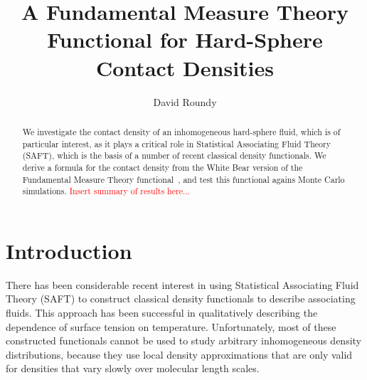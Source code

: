 \documentclass[letterpaper,twocolumn,amsmath,amssymb,prb]{revtex4-1}
\begin{document}
\title{A Fundamental Measure Theory Functional for Hard-Sphere Contact Densities}

\author{David Roundy}

\begin{abstract}
  We investigate the contact density of an inhomogeneous hard-sphere
  fluid, which is of particular interest, as it plays a critical role
  in Statistical Associating Fluid Theory (SAFT), which is the basis
  of a number of recent classical density functionals.  We derive a
  formula for the contact density from the White Bear version of the
  Fundamental Measure Theory functional~\cite{roth2002whitebear}, and
  test this functional agains Monte Carlo simulations.
  \textcolor{red}{Insert summary of results here...}
\end{abstract}

\maketitle

\section{Introduction}

\newcommand\saftlocaldft{felipe2001examination, gloor2002saft,%
  gloor2004accurate, clark2006developing, gloor2007prediction,%
  kahl2008modified, gross2009density}
\newcommand\saftnonlocaldft{yu2002fmt-dft-inhomogeneous-associating,%
  fu2005vapor-liquid-dft,bryk2006density}

There has been considerable recent interest in using Statistical
Associating Fluid Theory (SAFT) to construct classical density
functionals to describe associating
fluids\cite{\saftlocaldft,\saftnonlocaldft}.  This approach has been
successful in qualitatively describing the dependence of surface
tension on temperature.  Unfortunately, most of these constructed
functionals\cite{\saftlocaldft} cannot be used to study arbitrary
inhomogeneous density distributions, because they use local
density approximations that are only valid for densities that vary
slowly over molecular length scales.
\end{document}
